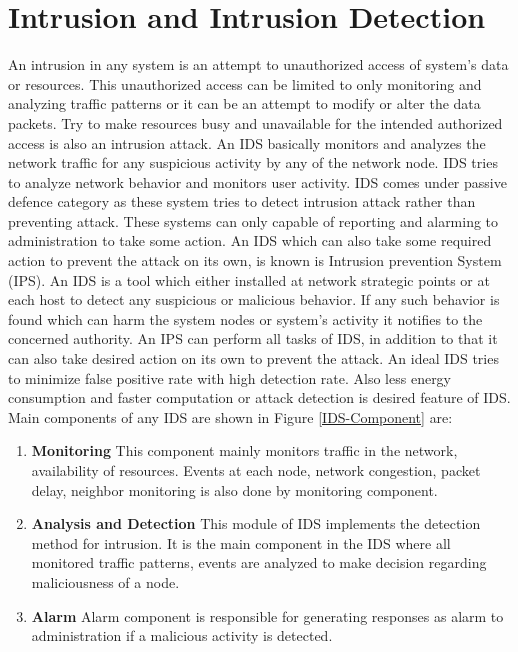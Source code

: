 \section{Intrusion and Intrusion Detection}
An intrusion in any system is an attempt to unauthorized access of system's data or resources. This unauthorized access can be limited to only monitoring and analyzing traffic patterns or it can be an attempt to modify or alter the data packets. Try to make resources busy and unavailable for the intended authorized access is also an intrusion attack. An IDS basically monitors and analyzes the network traffic for any suspicious activity by any of the network node. IDS tries to analyze network behavior and monitors user activity. IDS comes under passive defence category as these system tries to detect intrusion attack rather than preventing attack. These systems can only capable of reporting and alarming to administration to take some action. An IDS which can also take some required action to prevent the attack on its own, is known is Intrusion prevention System (IPS). An IDS is a tool which either installed at network strategic points or at each host to detect any suspicious or malicious behavior. If any such behavior is found which can harm the system nodes or system's activity it notifies to the concerned authority. An IPS can perform all tasks of IDS, in addition to that it can also take desired action on its own to prevent the attack. An ideal IDS tries to minimize false positive rate with high detection rate. Also less energy consumption and faster computation or attack detection is desired feature of IDS. Main components of any IDS are shown in Figure \ref{IDS-Component} \cite{alrajeh2013intrusion} are:
\begin{enumerate}[label=\textbf{\roman*.}]
\item \textbf{Monitoring} This component mainly monitors traffic in the network, availability of resources. Events at each node, network congestion, packet delay, neighbor monitoring is also done by monitoring component.
\item \textbf{Analysis and Detection} This module of IDS implements the detection method for intrusion. It is the main component in the IDS where all monitored traffic patterns, events are analyzed to make decision regarding maliciousness of a node.
\item \textbf{Alarm} Alarm component is responsible for generating responses as alarm to administration if a malicious activity is detected.
\end{enumerate}

